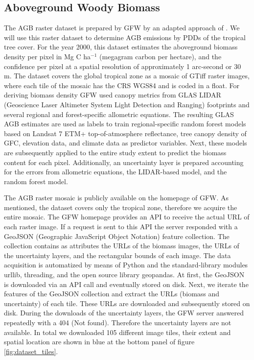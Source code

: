 	\subsection{Aboveground Woody Biomass}
		The \ac{AGB} raster dataset is prepared by \ac{GFW} by an adapted approach of \citet{Baccini2012,Baccini2015,Baccini2017}. We will use this raster dataset to determine \ac{AGB} emissions by \acp{PDD} of the tropical tree cover. For the year 2000, this dataset estimates the aboveground biomass density per pixel in Mg C ha$^{-1}$ (megagram carbon per hectare), and the confidence per pixel at a spatial resolution of approximately 1 arc-second or 30 m. The dataset covers the global tropical zone as a mosaic of \ac{GTiff} raster images, where each tile of the mosaic has the \ac{CRS} \ac{WGS84} and is coded in a float. For deriving biomass density \ac{GFW} used canopy metrics from GLAS LIDAR (Geoscience Laser Altimeter System Light Detection and Ranging) footprints and several regional and forest-specific allometric equations. The resulting GLAS \ac{AGB} estimates are used as labels to train regional-specific random forest models based on Landsat 7 ETM+ top-of-atmosphere reflectance, tree canopy density of \ac{GFC}, elevation data, and climate data as predictor variables. Next, these models are subsequently applied to the entire study extent to predict the biomass content for each pixel. Additionally, an uncertainty layer is prepared accounting for the errors from allometric equations, the LIDAR-based model, and the random forest model.

		The \ac{AGB} raster mosaic is publicly available on the homepage of \ac{GFW}. As mentioned, the dataset covers only the tropical zone, therefore we acquire the entire mosaic. The \ac{GFW} homepage provides an \ac{API} to receive the actual \ac{URL} of each raster image. If a request is sent to this \ac{API} the server responded with a GeoJSON (Geographic JavaScript Object Notation) feature collection. The collection contains as attributes the \acp{URL} of the biomass images, the \acp{URL} of the uncertainty layers, and the rectangular bounds of each image. The data acquisition is automatized by means of Python and the standard-library modules urllib, threading, and the open source library geopandas. At first, the GeoJSON is downloaded via an \ac{API} call and eventually stored on disk. Next, we iterate the features of the GeoJSON collection and extract the \ac{URL}s (biomass and uncertainty) of each tile. These \ac{URL}s are downloaded and subsequently stored on disk. During the downloads of the uncertainty layers, the \ac{GFW} server answered repeatedly with a 404 (Not found). Therefore the uncertainty layers are not available. In total we downloaded 105 different image tiles, their extent and spatial location are shown in blue at the bottom panel of figure \ref{fig:dataset_tiles}.

